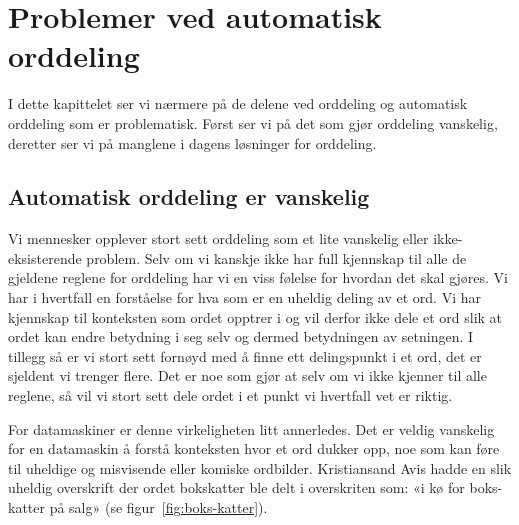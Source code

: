 \section{Problemer ved automatisk orddeling}

I dette kapittelet ser vi nærmere på de delene ved orddeling og automatisk orddeling som er problematisk. Først ser vi på det som gjør orddeling vanskelig, deretter ser vi på manglene i dagens løsninger for orddeling.

\subsection{Automatisk orddeling er vanskelig} %

Vi mennesker opplever stort sett orddeling som et lite vanskelig eller ikke-eksisterende problem. Selv om vi kanskje ikke har full kjennskap til alle de gjeldene reglene for orddeling har vi en viss følelse for hvordan det skal gjøres. Vi har i hvertfall en forståelse for hva som er en uheldig deling av et ord. Vi har kjennskap til konteksten som ordet opptrer i og vil derfor ikke dele et ord slik at ordet kan endre betydning i seg selv og dermed betydningen av setningen. I tillegg så er vi stort sett fornøyd med å finne ett delingspunkt i et ord, det er sjeldent vi trenger flere. Det er noe som gjør at selv om vi ikke kjenner til alle reglene, så vil vi stort sett dele ordet i et punkt vi hvertfall vet er riktig. 

For datamaskiner er denne virkeligheten litt annerledes. Det er veldig vanskelig for en datamaskin å forstå konteksten hvor et ord dukker opp, noe som kan føre til uheldige og misvisende eller komiske ordbilder. Kristiansand Avis hadde en slik uheldig overskrift der ordet bokskatter ble delt i overskriten som: «i kø for boks-katter på salg» (se figur~\ref{fig:boks-katter}).


